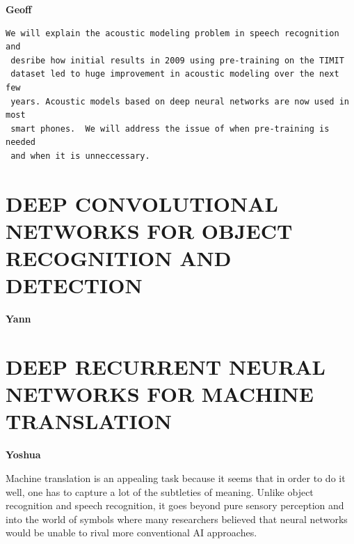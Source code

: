 \documentclass[11pt]{article} %
\begin{document}
{\bf Geoff}


\begin{verbatim}
We will explain the acoustic modeling problem in speech recognition and
 desribe how initial results in 2009 using pre-training on the TIMIT
 dataset led to huge improvement in acoustic modeling over the next few
 years. Acoustic models based on deep neural networks are now used in most
 smart phones.  We will address the issue of when pre-training is needed
 and when it is unneccessary.
\end{verbatim}


\section{DEEP CONVOLUTIONAL NETWORKS FOR OBJECT RECOGNITION AND DETECTION}


{\bf Yann}


\section{DEEP RECURRENT NEURAL NETWORKS FOR MACHINE TRANSLATION}


{\bf Yoshua}


Machine translation is an appealing task because it seems that in order to
do it well, one has to capture a lot of the subtleties of meaning. Unlike
object recognition and speech recognition, it goes beyond pure sensory
perception and into the world of symbols where many researchers believed
that neural networks would be unable to rival more conventional AI
approaches.
\end{document}
